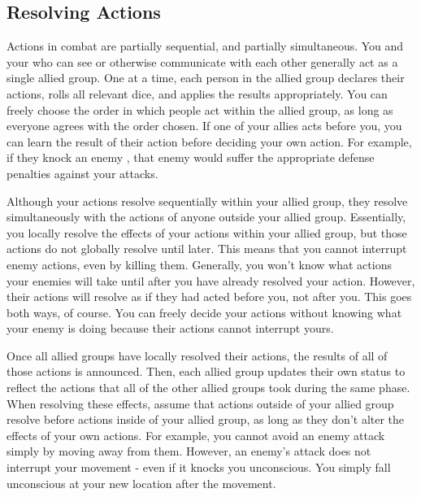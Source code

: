     \subsection{Resolving Actions}\label{Resolving Actions}

        Actions in combat are partially sequential, and partially simultaneous.
        You and your  who can see or otherwise communicate with each other generally act as a single allied group.
        One at a time, each person in the allied group declares their actions, rolls all relevant dice, and applies the results appropriately.
        You can freely choose the order in which people act within the allied group, as long as everyone agrees with the order chosen.
        If one of your allies acts before you, you can learn the result of their action before deciding your own action.
        For example, if they knock an enemy \prone, that enemy would suffer the appropriate defense penalties against your attacks.

        Although your actions resolve sequentially within your allied group, they resolve simultaneously with the actions of anyone outside your allied group.
        Essentially, you locally resolve the effects of your actions within your allied group, but those actions do not globally resolve until later.
        This means that you cannot interrupt enemy actions, even by killing them.
        Generally, you won't know what actions your enemies will take until after you have already resolved your action.
        However, their actions will resolve as if they had acted before you, not after you.
        This goes both ways, of course.
        You can freely decide your actions without knowing what your enemy is doing because their actions cannot interrupt yours.

        Once all allied groups have locally resolved their actions, the results of all of those actions is announced.
        Then, each allied group updates their own status to reflect the actions that all of the other allied groups took during the same phase.
        When resolving these effects, assume that actions outside of your allied group resolve before actions inside of your allied group, as long as they don't alter the effects of your own actions.
        For example, you cannot avoid an enemy attack simply by moving away from them.
        However, an enemy's attack does not interrupt your movement - even if it knocks you unconscious.
        You simply fall unconscious at your new location after the movement.

